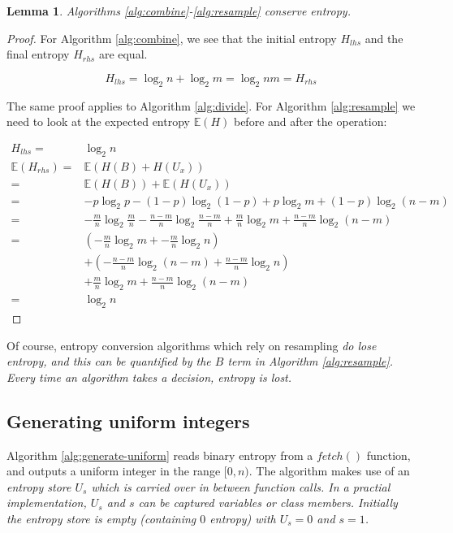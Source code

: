 \documentclass[12pt]{article}
\newtheorem{lemma}{Lemma}
\begin{document}
\begin{lemma}
\label{lem:conservation}
Algorithms \ref{alg:combine}-\ref{alg:resample} conserve entropy.
\end{lemma}

\begin{proof}
For Algorithm \ref{alg:combine}, we see that the initial entropy $H_{lhs}$ and the final entropy $H_{rhs}$ are equal.

\begin{equation}
H_{lhs} = \log_2n + \log_2m = \log_2nm = H_{rhs}
\end{equation}

The same proof applies to Algorithm \ref{alg:divide}. For Algorithm \ref{alg:resample} we need to look at the expected entropy $\mathbb{E}(H)$ before and after the operation:

\begin{align}
H_{lhs}             = &\log_2n \\
\mathbb{E}(H_{rhs}) = & \mathbb{E}(H(B) + H(U_x)) \\
                    = & \mathbb{E}(H(B)) + \mathbb{E}(H(U_x)) \\
                    = & -p\log_2p - (1-p)\log_2(1-p) + p\log_2m + (1-p)\log_2(n-m) \\
                    = & -\frac{m}{n}\log_2\frac{m}{n} - \frac{n-m}{n}\log_2\frac{n-m}{n} + \frac{m}{n}\log_2m + \frac{n-m}{n}\log_2(n-m) \\
                    = &(-\frac{m}{n}\log_2m + -\frac{m}{n}\log_2n) \\
                    & + (- \frac{n-m}{n}\log_2(n-m) + \frac{n-m}{n}\log_2n)\\
                    &+ \frac{m}{n}\log_2m + \frac{n-m}{n}\log_2(n-m) \\
                     = & \log_2n
\end{align}

\end{proof}

Of course, entropy conversion algorithms which rely on resampling \em do \em lose entropy, and this can be quantified by the $B$ term in Algorithm \ref{alg:resample}. Every time an algorithm takes a decision, entropy is lost.

\subsection{Generating uniform integers}

Algorithm \ref{alg:generate-uniform} reads binary entropy from a $fetch()$ function, and outputs a uniform integer in the range $[0,n)$. The algorithm makes use of an \em entropy store \em $U_s$ which is carried over in between function calls. In a practial implementation, $U_s$ and $s$ can be captured variables or class members. Initially the entropy store is empty (containing $0$ entropy) with $U_s = 0$ and $s=1$.
\end{document}
